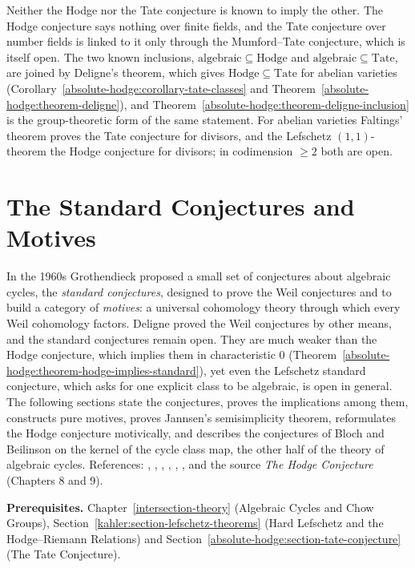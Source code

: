 \begin{remark}\label{absolute-hodge:remark-hodge-versus-tate}
Neither the Hodge nor the Tate conjecture is known to imply the other. The Hodge conjecture says nothing over finite fields, and the Tate conjecture over number fields is linked to it only through the
Mumford--Tate conjecture, which is itself open. The two known inclusions, $\mathrm{algebraic} \subseteq \mathrm{Hodge}$ and $\mathrm{algebraic} \subseteq \mathrm{Tate}$, are joined by Deligne's theorem, which gives
$\mathrm{Hodge} \subseteq \mathrm{Tate}$ for abelian varieties (Corollary~\ref{absolute-hodge:corollary-tate-classes} and Theorem~\ref{absolute-hodge:theorem-deligne}), and Theorem~\ref{absolute-hodge:theorem-deligne-inclusion}
is the group-theoretic form of the same statement. For abelian varieties Faltings' theorem proves the Tate conjecture for divisors, and the Lefschetz $(1,1)$-theorem the Hodge conjecture for
divisors; in codimension $\geq 2$ both are open.
\end{remark}

\section{The Standard Conjectures and Motives}\label{absolute-hodge:section-standard-conjectures}
In the 1960s Grothendieck proposed a small set of conjectures about algebraic cycles, the \emph{standard conjectures}, designed to prove the Weil conjectures and to build a category of
\emph{motives}: a universal cohomology theory through which every Weil cohomology factors. Deligne proved the Weil conjectures by other means, and the standard conjectures remain open. They
are much weaker than the Hodge conjecture, which implies them in characteristic $0$ (Theorem~\ref{absolute-hodge:theorem-hodge-implies-standard}), yet even the Lefschetz standard
conjecture, which asks for one explicit class to be algebraic, is open in general. The following sections state the conjectures, proves the implications among them, constructs pure motives, proves Jannsen's
semisimplicity theorem, reformulates the Hodge conjecture motivically, and describes the conjectures of Bloch and Beilinson on the kernel of the cycle class map, the other half of the theory of
algebraic cycles. References: \cite{grothendieck-standard}, \cite{kleiman-1968}, \cite{kleiman-1994}, \cite{scholl-1994}, \cite{andre-motifs}, \cite{jannsen-1994}, and the source
\emph{The Hodge Conjecture} (Chapters 8 and 9).

\noindent\textbf{Prerequisites.} Chapter~\ref{intersection-theory} (Algebraic Cycles and Chow Groups), Section~\ref{kahler:section-lefschetz-theorems} (Hard Lefschetz and the Hodge--Riemann Relations) and
Section~\ref{absolute-hodge:section-tate-conjecture} (The Tate Conjecture).

